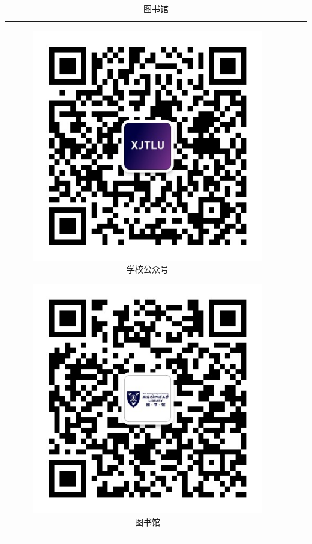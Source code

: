 \begin{table}[H]
    \begin{tabular}{ccc}
        \begin{subfigure}{0.25\columnwidth}
            \includegraphics[width=\linewidth]{author-folder/Kai.Wu/qrcode_XJTLU-China_1.jpg} \caption{学校公众号}
        \end{subfigure} \hfill
        \begin{subfigure}{0.25\columnwidth}
            \includegraphics[width=\linewidth]{author-folder/Kai.Wu/qrcode_XJTLU_library_1.jpg} \caption{图书馆}

\end{subfigure}
\end{tabular}
\end{table}
